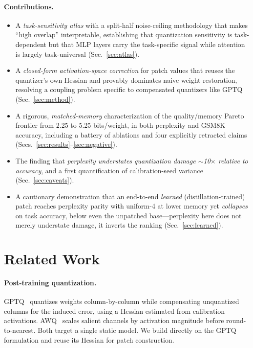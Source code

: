 \documentclass[11pt]{article}
\newcommand{\bpw}{bits/weight}
\begin{document}
\paragraph{Contributions.}
\begin{itemize}
  \item A \emph{task-sensitivity atlas} with a split-half noise-ceiling
    methodology that makes ``high overlap'' interpretable, establishing that
    quantization sensitivity is task-dependent but that MLP layers carry the
    task-specific signal while attention is largely task-universal
    (Sec.~\ref{sec:atlas}).
  \item A \emph{closed-form activation-space correction} for patch values that
    reuses the quantizer's own Hessian and provably dominates naive
    weight restoration, resolving a coupling problem specific to
    compensated quantizers like GPTQ (Sec.~\ref{sec:method}).
  \item A rigorous, \emph{matched-memory} characterization of the
    quality/memory Pareto frontier from 2.25 to 5.25 \bpw{}, in both
    perplexity and GSM8K accuracy, including a battery of ablations and four
    explicitly retracted claims (Secs.~\ref{sec:results}--\ref{sec:negative}).
  \item The finding that \emph{perplexity understates quantization damage
    $\sim$10$\times$ relative to accuracy}, and a first quantification of
    calibration-seed variance (Sec.~\ref{sec:caveats}).
  \item A cautionary demonstration that an end-to-end \emph{learned}
    (distillation-trained) patch reaches perplexity parity with uniform-4 at
    lower memory yet \emph{collapses} on task accuracy, below even the
    unpatched base---perplexity here does not merely understate damage, it
    inverts the ranking (Sec.~\ref{sec:learned}).
\end{itemize}

\section{Related Work}

\paragraph{Post-training quantization.} GPTQ~\cite{frantar2022gptq} quantizes
weights column-by-column while compensating unquantized columns for the
induced error, using a Hessian estimated from calibration activations.
AWQ~\cite{lin2023awq} scales salient channels by activation magnitude before
round-to-nearest. Both target a single static model. We build directly on the
GPTQ formulation and reuse its Hessian for patch construction.
\end{document}
